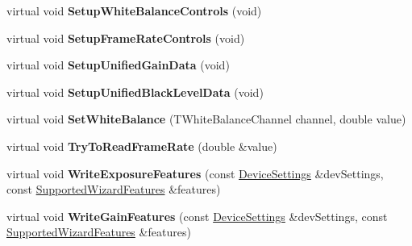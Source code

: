 \begin{DoxyCompactItemize}
\item 
\hypertarget{class_wizard_quick_setup_gen_i_cam_ada397ecca4fc67a201d921dba8dc6450}{virtual void {\bfseries Setup\+White\+Balance\+Controls} (void)}\label{class_wizard_quick_setup_gen_i_cam_ada397ecca4fc67a201d921dba8dc6450}

\item 
\hypertarget{class_wizard_quick_setup_gen_i_cam_a1aaaad4610c142ba0a16c4c662665861}{virtual void {\bfseries Setup\+Frame\+Rate\+Controls} (void)}\label{class_wizard_quick_setup_gen_i_cam_a1aaaad4610c142ba0a16c4c662665861}

\item 
\hypertarget{class_wizard_quick_setup_gen_i_cam_adacbe1fb44f8efc06623bf871b069055}{virtual void {\bfseries Setup\+Unified\+Gain\+Data} (void)}\label{class_wizard_quick_setup_gen_i_cam_adacbe1fb44f8efc06623bf871b069055}

\item 
\hypertarget{class_wizard_quick_setup_gen_i_cam_a7f72b01b054a39b3ae298d36656deced}{virtual void {\bfseries Setup\+Unified\+Black\+Level\+Data} (void)}\label{class_wizard_quick_setup_gen_i_cam_a7f72b01b054a39b3ae298d36656deced}

\item 
\hypertarget{class_wizard_quick_setup_gen_i_cam_af4de973531e89cd6494875c96328848a}{virtual void {\bfseries Set\+White\+Balance} (T\+White\+Balance\+Channel channel, double value)}\label{class_wizard_quick_setup_gen_i_cam_af4de973531e89cd6494875c96328848a}

\item 
\hypertarget{class_wizard_quick_setup_gen_i_cam_aa9356a91e80898ff8ffdefc5ad90e55b}{virtual void {\bfseries Try\+To\+Read\+Frame\+Rate} (double \&value)}\label{class_wizard_quick_setup_gen_i_cam_aa9356a91e80898ff8ffdefc5ad90e55b}

\item 
\hypertarget{class_wizard_quick_setup_gen_i_cam_a945b351f229681225fd6eeda02e6799e}{virtual void {\bfseries Write\+Exposure\+Features} (const \hyperlink{struct_wizard_quick_setup_1_1_device_settings}{Device\+Settings} \&dev\+Settings, const \hyperlink{struct_wizard_quick_setup_1_1_supported_wizard_features}{Supported\+Wizard\+Features} \&features)}\label{class_wizard_quick_setup_gen_i_cam_a945b351f229681225fd6eeda02e6799e}

\item 
\hypertarget{class_wizard_quick_setup_gen_i_cam_af92d30eb7db34312c76eb31c3538b76b}{virtual void {\bfseries Write\+Gain\+Features} (const \hyperlink{struct_wizard_quick_setup_1_1_device_settings}{Device\+Settings} \&dev\+Settings, const \hyperlink{struct_wizard_quick_setup_1_1_supported_wizard_features}{Supported\+Wizard\+Features} \&features)}\label{class_wizard_quick_setup_gen_i_cam_af92d30eb7db34312c76eb31c3538b76b}


\end{DoxyCompactItemize}
